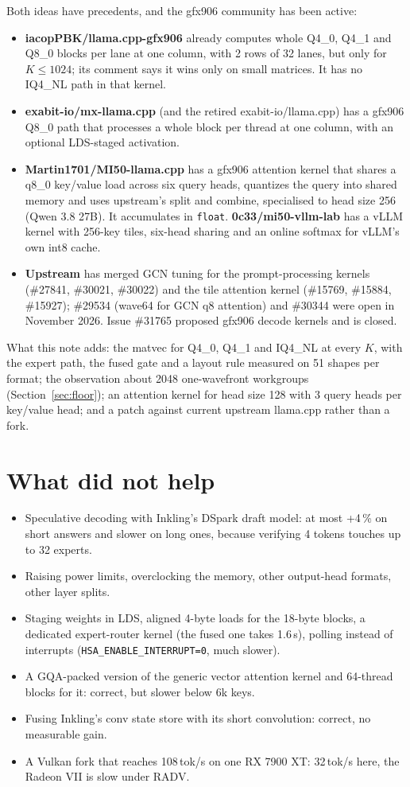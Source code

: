 \documentclass[11pt,a4paper]{article}
\newcommand{\code}[1]{\texttt{#1}}
\begin{document}
Both ideas have precedents, and the gfx906 community has been active:
\begin{itemize}
\item \textbf{iacopPBK/llama.cpp-gfx906} already computes whole Q4\_0, Q4\_1 and Q8\_0 blocks per lane at one column,
with 2 rows of 32 lanes, but only for $K \le 1024$; its comment says it wins only on small matrices. It has no IQ4\_NL
path in that kernel.
\item \textbf{exabit-io/mx-llama.cpp} (and the retired exabit-io/llama.cpp) has a gfx906 Q8\_0 path that processes a
whole block per thread at one column, with an optional LDS-staged activation.
\item \textbf{Martin1701/MI50-llama.cpp} has a gfx906 attention kernel that shares a q8\_0 key/value load across six
query heads, quantizes the query into shared memory and uses upstream's split and combine, specialised to head size
256 (Qwen 3.8 27B). It accumulates in \code{float}. \textbf{0c33/mi50-vllm-lab} has a vLLM kernel with 256-key tiles,
six-head sharing and an online softmax for vLLM's own int8 cache.
\item \textbf{Upstream} has merged GCN tuning for the prompt-processing kernels (\#27841, \#30021, \#30022) and the
tile attention kernel (\#15769, \#15884, \#15927); \#29534 (wave64 for GCN q8 attention) and \#30344 were open in
November 2026. Issue \#31765 proposed gfx906 decode kernels and is closed.
\end{itemize}
What this note adds: the matvec for Q4\_0, Q4\_1 and IQ4\_NL at every $K$, with the expert path, the fused gate and a
layout rule measured on 51 shapes per format; the observation about 2048 one-wavefront workgroups (Section~\ref{sec:floor}); an attention
kernel for head size 128 with 3 query heads per key/value head; and a patch against current upstream llama.cpp rather
than a fork.

\section{What did not help}

\begin{itemize}
\item Speculative decoding with Inkling's DSpark draft model: at most +4\,\% on short answers and slower on long ones,
because verifying 4 tokens touches up to 32 experts.
\item Raising power limits, overclocking the memory, other output-head formats, other layer splits.
\item Staging weights in LDS, aligned 4-byte loads for the 18-byte blocks, a dedicated expert-router kernel (the fused
one takes 1.6\,\textmu s), polling instead of interrupts (\code{HSA\_ENABLE\_INTERRUPT=0}, much slower).
\item A GQA-packed version of the generic vector attention kernel and 64-thread blocks for it: correct, but slower
below 6k keys.
\item Fusing Inkling's conv state store with its short convolution: correct, no measurable gain.
\item A Vulkan fork that reaches 108\,tok/s on one RX 7900 XT: 32\,tok/s here, the Radeon VII is slow under RADV.
\end{itemize}
\end{document}
